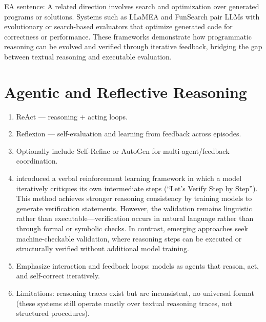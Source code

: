\documentclass[project]{bsu-cs}  %
\begin{document}
EA sentence: A related direction involves search and optimization over generated programs or solutions. Systems such as LLaMEA \citep{zhou2024llamea} and FunSearch \citep{rombach2024funsearch} pair LLMs with evolutionary or search-based evaluators that optimize generated code for correctness or performance. These frameworks demonstrate how programmatic reasoning can be evolved and verified through iterative feedback, bridging the gap between textual reasoning and executable evaluation.
% 
%
%
% 
\section{Agentic and Reflective Reasoning}\label{sec:reasoning}
\begin{enumerate}
    \item ReAct \citep{yao2023reactsynergizingreasoningacting} — reasoning + acting loops.

    \item Reflexion \citep{shinn2023reflexionlanguageagentsverbal} — self-evaluation and learning from feedback across episodes.

    \item Optionally include Self-Refine \citep{madaan2023selfrefineiterativerefinementselffeedback} or AutoGen \citep{wu2023autogenenablingnextgenllm} for multi-agent/feedback coordination.

    \item \citet{lightman2023letsverifystepstep} introduced a verbal reinforcement learning framework in which a model iteratively critiques its own intermediate steps (“Let’s Verify Step by Step”). This method achieves stronger reasoning consistency by training models to generate verification statements. However, the validation remains linguistic rather than executable—verification occurs in natural language rather than through formal or symbolic checks. In contrast, emerging approaches seek machine-checkable validation, where reasoning steps can be executed or structurally verified without additional model training.
    \item Emphasize interaction and feedback loops: models as agents that reason, act, and self-correct iteratively.

    \item Limitations: reasoning traces exist but are inconsistent, no universal format (these systems still operate mostly over textual reasoning traces, not structured procedures).

\end{enumerate}
% 
%
%
% 
\end{document}
